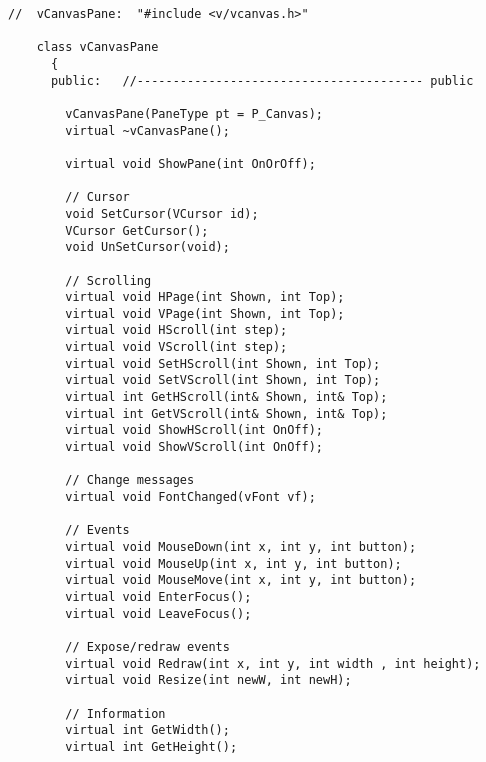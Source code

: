
\footnotesize
\begin{verbatim}
//  vCanvasPane:  "#include <v/vcanvas.h>"

    class vCanvasPane
      {
      public:   //---------------------------------------- public

        vCanvasPane(PaneType pt = P_Canvas);
        virtual ~vCanvasPane();

        virtual void ShowPane(int OnOrOff);

        // Cursor
        void SetCursor(VCursor id);
        VCursor GetCursor();
        void UnSetCursor(void);

        // Scrolling
        virtual void HPage(int Shown, int Top);
        virtual void VPage(int Shown, int Top);
        virtual void HScroll(int step);
        virtual void VScroll(int step);
        virtual void SetHScroll(int Shown, int Top);
        virtual void SetVScroll(int Shown, int Top);
        virtual int GetHScroll(int& Shown, int& Top);
        virtual int GetVScroll(int& Shown, int& Top);
        virtual void ShowHScroll(int OnOff);
        virtual void ShowVScroll(int OnOff);

        // Change messages
        virtual void FontChanged(vFont vf);

        // Events
        virtual void MouseDown(int x, int y, int button);
        virtual void MouseUp(int x, int y, int button);
        virtual void MouseMove(int x, int y, int button);
        virtual void EnterFocus();
        virtual void LeaveFocus();

        // Expose/redraw events
        virtual void Redraw(int x, int y, int width , int height);
        virtual void Resize(int newW, int newH);

        // Information
        virtual int GetWidth();
        virtual int GetHeight();


\end{verbatim}

